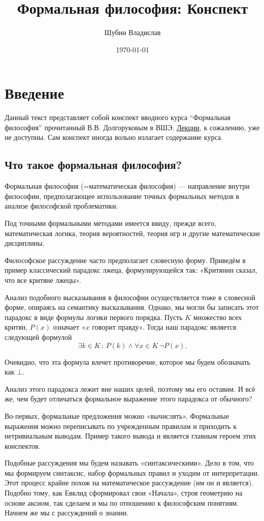 \documentclass[openany]{book}
\date{\today}
\author{Шубин Владислав}
\title{Формальная философия: Конспект}
\theoremstyle{plain}
\theoremstyle{definition}
\begin{document}
\chapter{Введение}

Данный текст представляет собой конспект вводного курса ``Формальная философия'' прочитанный В.В. Долгоруковым в ВШЭ. \href{https://drive.google.com/drive/folders/14R_Xut-3dRLUAvHlE7vkMyW9hsI8oiwV}{Лекции}, к сожалению, уже не доступны. Сам конспект иногда вольно излагает содержание курса.

\section{ Что такое формальная философия? }

Формальная философия (=математическая философия) — направление внутри философии, предполагающее использование точных формальных методов в анализе философской проблематики.

Под точными формальными методами имеется ввиду, прежде всего, математическая логика, теория вероятностей, теория игр и другие математические дисциплины.

Философское рассуждение часто предполагает словесную форму. Приведём в пример классический парадокс лжеца, формулирующейся так:
«Критянин сказал, что все критяне лжецы».

Анализ подобного высказывания в философии осуществляется тоже в словесной форме, опираясь на семантику высказывания. Однако, мы могли бы записать этот парадокс в виде формулы логики первого порядка. Пусть $K$ множество всех критян, \(P(x)\) означает «\(x\) говорит правду». Тогда наш парадокс является следующей формулой \[\exists k \in K \, : \, P(k) \land \forall x \in K \, \neg P(x).\]

\noindent Очевидно, что эта формула влечет противоречие, которое мы будем обозначать как $\bot$.

Анализ этого парадокса лежит вне наших целей, поэтому мы его оставим. И всё же, чем будет отличаться формальное выражение этого парадокса от обычного?

Во-первых, формальные предложения можно «вычислять». Формальные выражения можно переписывать по учрежденным правилам и приходить к нетривиальным выводам. Пример такого вывода и является главным героем этих конспектов.

Подобные рассуждения мы будем называть «синтаксическими». Дело в том, что мы формируем синтаксис, набор формальных правил и уходим от интерпретации. Этот процесс крайне похож на математическое рассуждение (им он и является). Подобно тому, как Евклид сформировал свои «Начала», строя геометрию на основе аксиом, так сделаем и мы по отношению к философским понятиям. Начнем же мы с рассуждений о знании.
\end{document}
